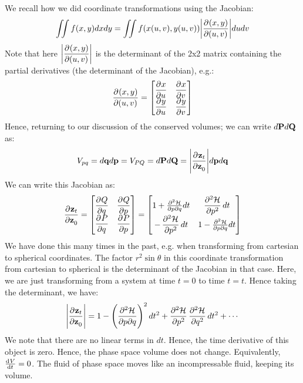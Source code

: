 \begin{s}
We recall how we did coordinate transformations using the Jacobian:
\[\iint f(x, y)dxdy = \iint f(x(u, v), y(u, v)) \abs{\dpd{(x,y)}{(u, v)}}dudv\]
Note that here $\abs{\dpd{(x,y)}{(u, v)}}$ is the determinant of the 2x2 matrix containing the partial derivatives (the determinant of the Jacobian), e.g.:
\[\dpd{(x,y)}{(u, v)} = \m{\dpd{x}{u} & \dpd{x}{v} \\ \dpd{y}{u} & \dpd{y}{v}}\]
Hence, returning to our discussion of the conserved volumes; we can write $d\mathbf{P}d\mathbf{Q}$ as:
\[V_{pq} = d\v{q}d\v{p} = V_{PQ} = d\v{P}d\v{Q} = \abs{\dpd{\v{z}_t}{\v{z}_0}}d\v{p}d\v{q}\]
We can write this Jacobian as:
\[\dpd{\v{z}_t}{\v{z}_0} = \m{\dpd{Q}{q} & \dpd{Q}{p} \\ \dpd{P}{q} & \dpd{P}{p}} = \m{1 + \pdv{\HH}{p}{q}dt & \dpd[2]{\HH}{p}dt \\ -\dpd[2]{\HH}{p}dt & 1 - \pdv{\HH}{p}{q}dt }\]
We have done this many times in the past, e.g. when transforming from cartesian to spherical coordinates. The factor $r^2\sin\theta$ in this coordinate transformation from cartesian to spherical is the determinant of the Jacobian in that case. Here, we are just transforming from a system at time $t = 0$ to time $t = t$. Hence taking the determinant, we have:
\[\abs{\dpd{\v{z}_t}{\v{z}_0}} = 1 - \left(\pdv{\HH}{p}{q}\right)^2dt^2 + \dpd[2]{\HH}{p}\dpd[2]{\HH}{q}dt^2 + \cdots \]
We note that there are no linear terms in $dt$. Hence, the time derivative of this object is zero. Hence, the phase space volume does not change. Equivalently, $\od{V}{t} = 0$. The fluid of phase space moves like an incompressable fluid, keeping its volume. 
\end{s} 